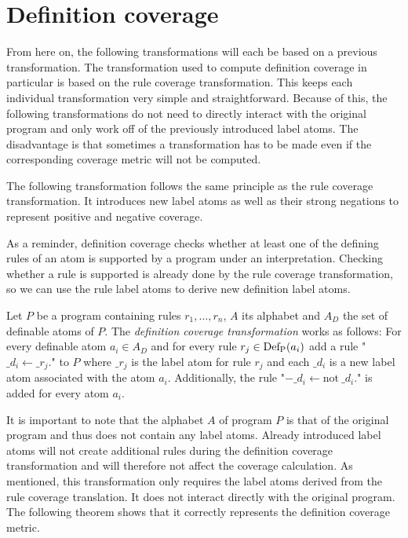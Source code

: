 \section{Definition coverage}
\label{sec:Computing coverage metrics for propositional programs/Definition coverage}
From here on, the following transformations will each be based on a previous transformation. The transformation used to compute definition coverage in particular is based on the rule coverage transformation. This keeps each individual transformation very simple and straightforward. Because of this, the following transformations do not need to directly interact with the original program and only work off of the previously introduced label atoms. The disadvantage is that sometimes a transformation has to be made even if the corresponding coverage metric will not be computed. 

The following transformation follows the same principle as the rule coverage transformation. It introduces new label atoms as well as their strong negations to represent positive and negative coverage.

As a reminder, definition coverage checks whether at least one of the defining rules of an atom is supported by a program under an interpretation. Checking whether a rule is supported is already done by the rule coverage transformation, so we can use the rule label atoms to derive new definition label atoms.

\begin{definition}
\label{def:definition transformation}
    Let $P$ be a program containing rules \(r_1, \ldots, r_n\), $A$ its alphabet and $A_D$ the set of definable atoms of $P$. The \emph{definition coverage transformation} works as follows: For every definable atom \(a_i \in A_D\) and for every rule \(r_j \in \operatorname{Def_P}(a_i)\) add a rule "\(\_d_i \leftarrow \_r_j.\)" to $P$ where $\_r_j$ is the label atom for rule $r_j$ and each $\_d_i$ is a new label atom associated with the atom $a_i$. Additionally, the rule "\(-\_d_i \leftarrow \text{not}\ \_d_i.\)" is added for every atom $a_i$.
\end{definition}

It is important to note that the alphabet $A$ of program $P$ is that of the original program and thus does not contain any label atoms. Already introduced label atoms will not create additional rules during the definition coverage transformation and will therefore not affect the coverage calculation.
As mentioned, this transformation only requires the label atoms derived from the rule coverage translation. It does not interact directly with the original program. The following theorem shows that it correctly represents the definition coverage metric. 

